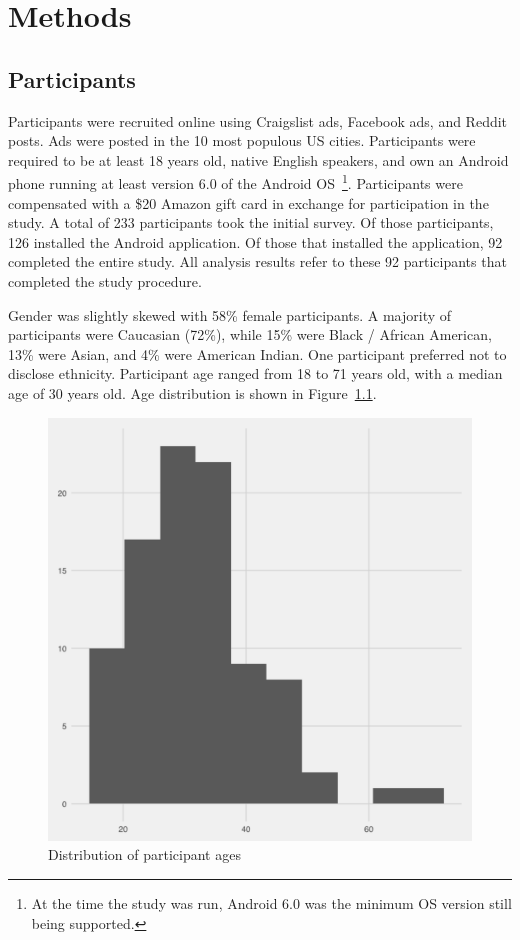 \documentclass[12pt]{nuthesis}	%
\begin{document}
\chapter{Methods}

\section{Participants}

Participants were recruited online using Craigslist ads, Facebook ads, and Reddit posts. Ads were posted in the 10 most populous US cities. Participants were required to be at least 18 years old, native English speakers, and own an Android phone running at least version 6.0 of the Android OS~\footnote{At the time the study was run, Android 6.0 was the minimum OS version still being supported.}. Participants were compensated with a \$20 Amazon gift card in exchange for participation in the study. A total of 233 participants took the initial survey. Of those participants, 126 installed the Android application. Of those that installed the application, 92 completed the entire study. All analysis results refer to these 92 participants that completed the study procedure.

Gender was slightly skewed with 58\% female participants. A majority of participants were Caucasian (72\%), while 15\% were Black / African American, 13\% were Asian, and 4\% were American Indian. One participant preferred not to disclose ethnicity. Participant age ranged from 18 to 71 years old, with a median age of 30 years old. Age distribution is shown in Figure~\ref{fig:age}.

\begin{figure}[h]
\centering
\includegraphics[width=.7\textwidth]{figures/age_distribution}
\caption{Distribution of participant ages}
\label{fig:age}
\end{figure}
\end{document}
